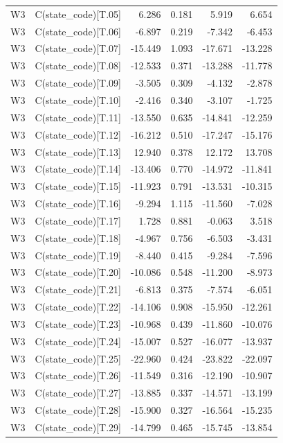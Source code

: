\documentclass[11pt,a4paper]{report}
\begin{document}
\begin{longtable}{l>{\raggedright\arraybackslash}p{6cm}rrrr}
W3 & C(state\_code)[T.05] & 6.286 & 0.181 & 5.919 & 6.654 \\
W3 & C(state\_code)[T.06] & -6.897 & 0.219 & -7.342 & -6.453 \\
W3 & C(state\_code)[T.07] & -15.449 & 1.093 & -17.671 & -13.228 \\
W3 & C(state\_code)[T.08] & -12.533 & 0.371 & -13.288 & -11.778 \\
W3 & C(state\_code)[T.09] & -3.505 & 0.309 & -4.132 & -2.878 \\
W3 & C(state\_code)[T.10] & -2.416 & 0.340 & -3.107 & -1.725 \\
W3 & C(state\_code)[T.11] & -13.550 & 0.635 & -14.841 & -12.259 \\
W3 & C(state\_code)[T.12] & -16.212 & 0.510 & -17.247 & -15.176 \\
W3 & C(state\_code)[T.13] & 12.940 & 0.378 & 12.172 & 13.708 \\
W3 & C(state\_code)[T.14] & -13.406 & 0.770 & -14.972 & -11.841 \\
W3 & C(state\_code)[T.15] & -11.923 & 0.791 & -13.531 & -10.315 \\
W3 & C(state\_code)[T.16] & -9.294 & 1.115 & -11.560 & -7.028 \\
W3 & C(state\_code)[T.17] & 1.728 & 0.881 & -0.063 & 3.518 \\
W3 & C(state\_code)[T.18] & -4.967 & 0.756 & -6.503 & -3.431 \\
W3 & C(state\_code)[T.19] & -8.440 & 0.415 & -9.284 & -7.596 \\
W3 & C(state\_code)[T.20] & -10.086 & 0.548 & -11.200 & -8.973 \\
W3 & C(state\_code)[T.21] & -6.813 & 0.375 & -7.574 & -6.051 \\
W3 & C(state\_code)[T.22] & -14.106 & 0.908 & -15.950 & -12.261 \\
W3 & C(state\_code)[T.23] & -10.968 & 0.439 & -11.860 & -10.076 \\
W3 & C(state\_code)[T.24] & -15.007 & 0.527 & -16.077 & -13.937 \\
W3 & C(state\_code)[T.25] & -22.960 & 0.424 & -23.822 & -22.097 \\
W3 & C(state\_code)[T.26] & -11.549 & 0.316 & -12.190 & -10.907 \\
W3 & C(state\_code)[T.27] & -13.885 & 0.337 & -14.571 & -13.199 \\
W3 & C(state\_code)[T.28] & -15.900 & 0.327 & -16.564 & -15.235 \\
W3 & C(state\_code)[T.29] & -14.799 & 0.465 & -15.745 & -13.854 \\

\end{longtable}
\end{document}
